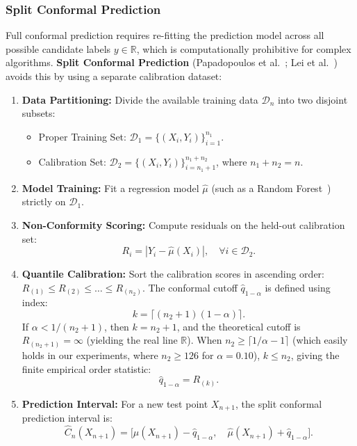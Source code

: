 \documentclass[journal]{IEEEtran}
\begin{document}
\subsubsection{Split Conformal Prediction}
Full conformal prediction requires re-fitting the prediction model across all possible candidate labels $y \in \mathbb{R}$, which is computationally prohibitive for complex algorithms. \textbf{Split Conformal Prediction} (Papadopoulos et al.~\cite{papadopoulos2002}; Lei et al.~\cite{lei2018}) avoids this by using a separate calibration dataset:
\begin{enumerate}
    \item \textbf{Data Partitioning:} Divide the available training data $\mathcal{D}_n$ into two disjoint subsets:
    \begin{itemize}
        \item Proper Training Set: $\mathcal{D}_1 = \{(X_i, Y_i)\}_{i=1}^{n_1}$.
        \item Calibration Set: $\mathcal{D}_2 = \{(X_i, Y_i)\}_{i=n_1+1}^{n_1+n_2}$, where $n_1 + n_2 = n$.
    \end{itemize}
    \item \textbf{Model Training:} Fit a regression model $\hat{\mu}$ (such as a Random Forest~\cite{breiman2001}) strictly on $\mathcal{D}_1$.
    \item \textbf{Non-Conformity Scoring:} Compute residuals on the held-out calibration set:
    \begin{equation}
    R_i = |Y_i - \hat{\mu}(X_i)|, \quad \forall i \in \mathcal{D}_2.
    \end{equation}
    \item \textbf{Quantile Calibration:} Sort the calibration scores in ascending order: $R_{(1)} \le R_{(2)} \le \dots \le R_{(n_2)}$. The conformal cutoff $\hat{q}_{1-\alpha}$ is defined using index:
    \begin{equation}
    k = \lceil (n_2 + 1)(1 - \alpha) \rceil.
    \end{equation}
    If $\alpha < 1 / (n_2 + 1)$, then $k = n_2 + 1$, and the theoretical cutoff is $R_{(n_2+1)} = \infty$ (yielding the real line $\mathbb{R}$). When $n_2 \ge \lceil 1/\alpha - 1 \rceil$ (which easily holds in our experiments, where $n_2 \ge 126$ for $\alpha = 0.10$), $k \le n_2$, giving the finite empirical order statistic:
    \begin{equation}
    \hat{q}_{1-\alpha} = R_{(k)}.
    \end{equation}
    \item \textbf{Prediction Interval:} For a new test point $X_{n+1}$, the split conformal prediction interval is:
    \begin{equation}
    \hat{C}_n(X_{n+1}) = \big[ \hat{\mu}(X_{n+1}) - \hat{q}_{1-\alpha}, \quad \hat{\mu}(X_{n+1}) + \hat{q}_{1-\alpha} \big].
    \end{equation}
\end{enumerate}
\end{document}
